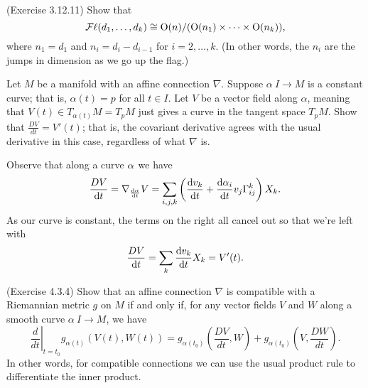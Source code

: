 \documentclass[12pt]{memoir}
\begin{document}
\begin{Ej}
    (Exercise 3.12.11) Show that 
	\[
		\operatorname{\mathcal{F}\ell}(d_1, \dots, d_k) \cong \mathrm{O}(n)/(\mathrm{O}(n_1) \times \dots \times \mathrm{O}(n_k)),
	\]
	where $n_1 = d_1$ and $n_i = d_i - d_{i-1}$ for $i=2, \dots , k$. (In other words, the $n_i$ are the jumps in dimension as we go up the flag.)
\end{Ej}

\begin{Ej}
	Let $M$ be a manifold with an affine connection $\nabla$. Suppose $\alpha \: I \to M$ is a constant curve; that is, $\alpha(t) = p$ for all $t \in I$. Let $V$ be a vector field along $\alpha$, meaning that $V(t) \in T_{\alpha(t)}M = T_p M$ just gives a curve in the tangent space $T_pM$. Show that $\frac{DV}{dt} = V'(t)$; that is, the covariant derivative agrees with the usual derivative in this case, regardless of what $\nabla$ is.
\end{Ej}

\begin{ptcbr}
	Observe that along a curve $\alpha$ we have 
	$$\frac{DV}{\dd t}=\nabla_{\dv{\alpha}{t}}V=\sum_{i,j,k}\left(\dv{v_k}{t}+\dv{\alpha_i}{t}v_j\Gamma_{ij}^k\right)X_k.$$
	As our curve is constant, the terms on the right all cancel out so that we're left with 
	$$\frac{DV}{\dd t}=\sum_k\dv{v_k}{t}X_k=V'(t).$$
\end{ptcbr}

\begin{Ej}
	(Exercise 4.3.4) Show that an affine connection $\nabla$ is compatible with a Riemannian metric $g$ on $M$ if and only if, for any vector fields $V$ and $W$ along a smooth curve $\alpha \: I \to M$, we have
	\[
		\left.\frac{d}{dt}\right|_{t=t_0} g_{\alpha(t)}(V(t),W(t)) = g_{\alpha(t_0)} \left(\frac{DV}{dt},W\right) + g_{\alpha(t_0)} \left(V,\frac{DW}{dt}\right).
	\]
	In other words, for compatible connections we can use the usual product rule to differentiate the inner product.
\end{Ej}
\end{document}
